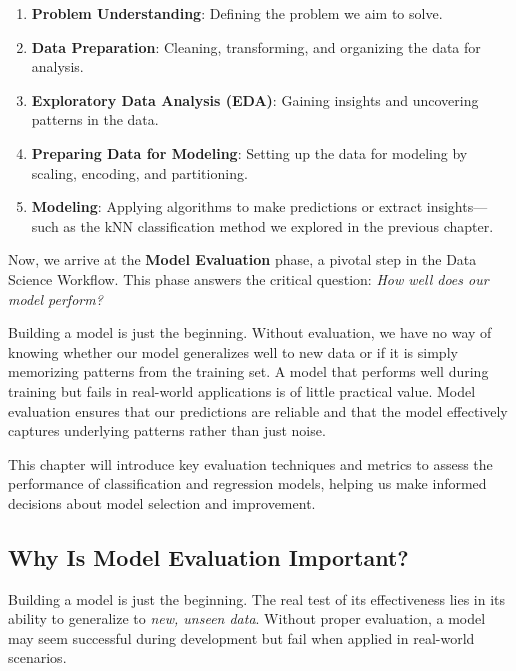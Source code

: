 \documentclass[
  11pt,
]{book}
\providecommand{\tightlist}{%
  \setlength{\itemsep}{0pt}\setlength{\parskip}{0pt}}
\theoremstyle{definition}
\theoremstyle{definition}
\theoremstyle{definition}
\theoremstyle{definition}
\theoremstyle{remark}
\begin{document}
\begin{enumerate}
\def\labelenumi{\arabic{enumi}.}
\tightlist
\item
  \textbf{Problem Understanding}: Defining the problem we aim to solve.\\
\item
  \textbf{Data Preparation}: Cleaning, transforming, and organizing the data for analysis.\\
\item
  \textbf{Exploratory Data Analysis (EDA)}: Gaining insights and uncovering patterns in the data.\\
\item
  \textbf{Preparing Data for Modeling}: Setting up the data for modeling by scaling, encoding, and partitioning.\\
\item
  \textbf{Modeling}: Applying algorithms to make predictions or extract insights---such as the kNN classification method we explored in the previous chapter.
\end{enumerate}

Now, we arrive at the \textbf{Model Evaluation} phase, a pivotal step in the Data Science Workflow. This phase answers the critical question: \emph{How well does our model perform?}

Building a model is just the beginning. Without evaluation, we have no way of knowing whether our model generalizes well to new data or if it is simply memorizing patterns from the training set. A model that performs well during training but fails in real-world applications is of little practical value. Model evaluation ensures that our predictions are reliable and that the model effectively captures underlying patterns rather than just noise.

This chapter will introduce key evaluation techniques and metrics to assess the performance of classification and regression models, helping us make informed decisions about model selection and improvement.

\subsection*{Why Is Model Evaluation Important?}\label{why-is-model-evaluation-important}


Building a model is just the beginning. The real test of its effectiveness lies in its ability to generalize to \emph{new, unseen data}. Without proper evaluation, a model may seem successful during development but fail when applied in real-world scenarios.
\end{document}
